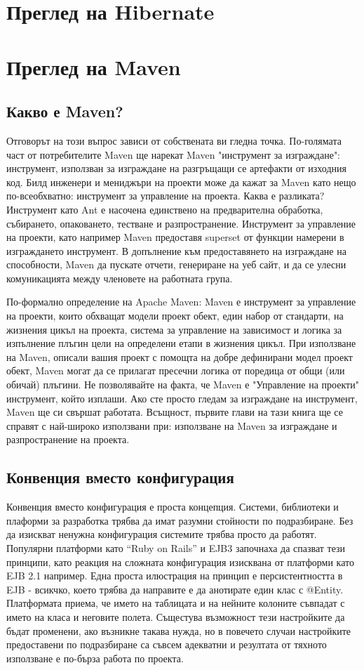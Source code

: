 \section{Преглед на Hibernate}
\section{Преглед на Maven}
\subsection{Какво е Maven?} 
Отговорът на този въпрос зависи от собствената ви
гледна точка. По-голямата част от потребителите Maven ще нарекат Maven
"инструмент за изграждане": инструмент, използван за изграждане на
разгръщащи се артефакти от изходния код. Билд инженери и мениджъри на
проекти може да кажат за Maven като нещо по-всеобхватно: инструмент за
управление на проекта. Каква е разликата? Инструмент като Ant е
насочена единствено на предварителна обработка, събирането,
опаковането, тестване и разпространение. Инструмент за управление на
проекти, като например Maven предоставя superset от функции намерени в
изграждането инструмент. В допълнение към предоставянето на изграждане
на способности, Maven да пускате отчети, генериране на уеб сайт, и да
се улесни комуникацията между членовете на работната група.

По-формално определение на Apache Maven: Maven е инструмент за
управление на проекти, които обхващат модели проект обект, един набор
от стандарти, на жизнения цикъл на проекта, система за управление на
зависимост и логика за изпълнение плъгин цели на определени етапи в
жизнения цикъл. При използване на Maven, описали вашия проект с
помощта на добре дефинирани модел проект обект, Maven могат да се
прилагат пресечни логика от поредица от общи (или обичай) плъгини.  Не
позволявайте на факта, че Maven е "Управление на проекти" инструмент,
който изплаши. Ако сте просто гледам за изграждане на инструмент,
Maven ще си свършат работата. Всъщност, първите глави на тази книга ще
се справят с най-широко използвани при: използване на Maven за
изграждане и разпространение на проекта.
\subsection{Конвенция вместо конфигурация}
Конвенция вместо конфигурация е проста концепция. Системи, библиотеки
и плаформи за разработка  
трябва да имат разумни стойности по подразбиране. Без да изискват
ненужна конфигурация системите трябва просто да работят. Популярни
платформи като "`Ruby on Rails"' и EJB3 започнаха да спазват тези
принципи, като реакция на сложната конфигурация изисквана от платформи
като EJB 2.1 например. Една проста илюстрация на принцип е
персистентността в EJB - всикчко, което трябва да направите е да
анотирате един клас с @Entity. Платформата приема, че името на
таблицата и на нейните колоните съвпадат с името на класа и неговите
полета. Същестува възможност тези настройките да бъдат променени, ако
възникне такава нужда, но в повечето случаи настройките предоставени
по подразбиране са съвсем адекватни и резултата от тяхното използване
е по-бърза работа по проекта.

